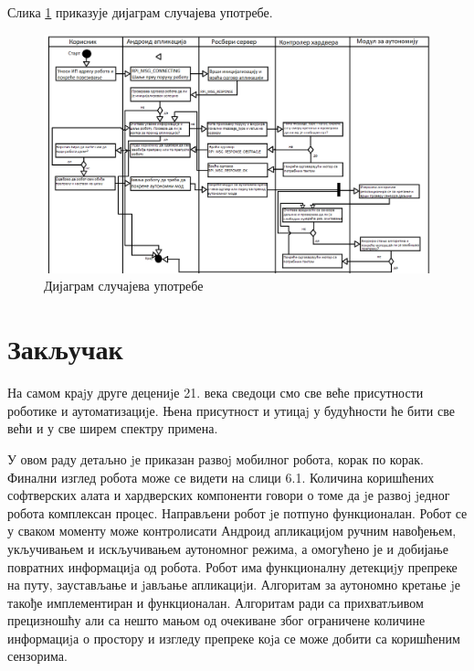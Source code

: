 \documentclass[12pt,oneside]{memoir}
\theoremstyle{remark}
\begin{document}
Слика \ref{fig:dijagramklasaapp} приказује дијаграм случајева употребе.

\begin{figure}[!ht]
\centering
\includegraphics[width=1.0\textwidth]{slike/aktvivnostidijagram.png}
\caption{Дијаграм случајева употребе }
\label{fig:dijagramklasaapp}
\end{figure}



\chapter{Закључак}
\label{chp:zakljucak}
На самом краjу друге децениjе 21. века сведоци смо све веће присутности роботике и аутоматизациjе. Њена присутност и утицаj у будућности ће бити све већи и у све ширем спектру примена. 

У овом раду детаљно jе приказан развоj мобилног робота, корак по корак. Финални изглед робота може се видети на слици 6.1. Количина коришћених софтверских алата и хардверских компоненти говори о томе да jе развоj jедног робота комплексан процес. Направљени робот jе потпуно функционалан. Робот се у сваком моменту може контролисати Андроид апликациjом ручним навођењем, укључивањем и искључивањем аутономног режима, а омогућено је и добијање повратних информациjа од робота. Робот има функционалну детекциjу препреке на путу, заустављање и jављање апликациjи. Алгоритам за аутономно кретање jе такође имплементиран и функционалан. Алгоритам ради са прихватљивом прецизношћу али са нешто мањом од очекиване због ограничене количине информациjа о простору и изгледу препреке коjа се може добити са коришћеним сензорима.
\end{document}

